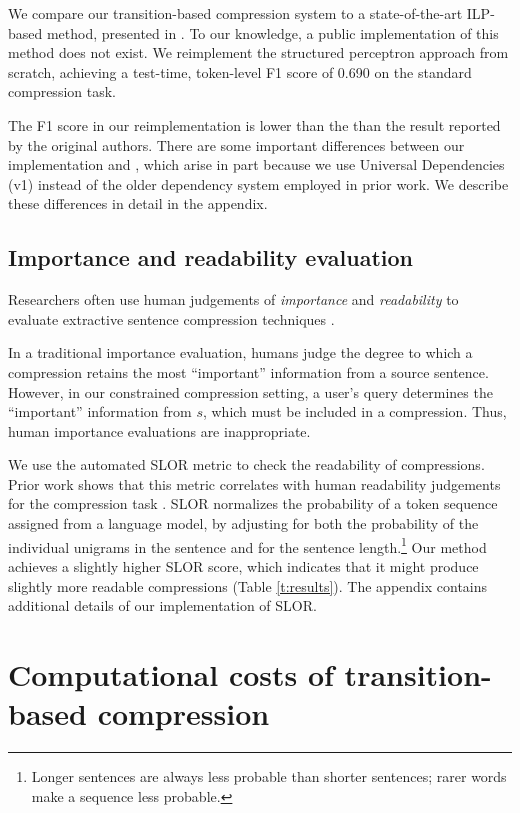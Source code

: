 \documentclass[11pt,a4paper]{article}
\begin{document}
We compare our transition-based compression system to a state-of-the-art ILP-based method, presented in \citet{filippova2013overcoming}. To our knowledge, a public implementation of this method does not exist. We reimplement the structured perceptron approach from scratch, achieving a test-time, token-level F1 score of  0.690 on the standard compression task. 

The F1 score in our reimplementation is lower than the than the result reported by the original authors. There are some important differences between our implementation and \citet{filippova2013overcoming}, which arise in part because we use Universal Dependencies (v1) instead of the older dependency system employed in prior work. We describe these differences in detail in the appendix.

\subsection{Importance and readability evaluation}\label{s:readabilityinformativeness}

Researchers often use human judgements of \textit{importance} and \textit{readability} to evaluate extractive sentence compression techniques \cite{Knight2000StatisticsBasedS,clarke2008global,filippova2015sentence}. 

In a traditional importance evaluation, humans judge the degree to which a compression retains the most ``important'' information from a source sentence. However, in our constrained compression setting, a user's query determines the ``important'' information from $s$, which must be included in a compression. Thus, human importance evaluations are inappropriate.
 
We use the automated SLOR metric \cite{lau2015unsupervised} to check the readability of compressions. Prior work shows that this metric correlates with human readability judgements for the compression task \cite{kannConl}. SLOR normalizes the probability of a token sequence assigned from a language model, by adjusting for both the probability of the individual unigrams in the sentence and for the sentence length.\footnote{Longer sentences are always less probable than shorter sentences; rarer words make a sequence less probable.} Our method achieves a slightly higher SLOR score, which indicates that it might produce slightly more readable compressions (Table \ref{t:results}). The appendix contains additional details of our implementation of SLOR. 

\section{Computational costs of transition-based compression}\label{s:costs}
\end{document}

